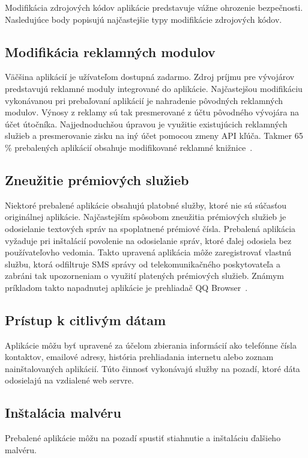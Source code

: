 Modifikácia zdrojových kódov aplikácie predstavuje vážne ohrozenie bezpečnosti. Nasledujúce body popisujú najčastejšie typy modifikácie zdrojových kódov.

\subsection*{Modifikácia reklamných modulov}
Väčšina aplikácií je užívateľom dostupná zadarmo. Zdroj príjmu pre vývojárov predstavujú reklamné moduly integrované do aplikácie. Najčastejšou modifikáciu vykonávanou pri prebaľovaní aplikácií je nahradenie pôvodných reklamných modulov. Výnosy z reklamy sú tak presmerované z účtu pôvodného vývojára na účet útočníka. Najjednoduchšou úpravou je využitie existujúcich reklamných služieb a presmerovanie zisku na iný účet pomocou zmeny API kľúča. Takmer 65 \% prebalených aplikácií obsahuje modifikované reklamné knižnice~\cite{fakeapps}.

\subsection*{Zneužitie prémiových služieb}
Niektoré prebalené aplikácie obsahujú platobné služby, ktoré nie sú súčasťou originálnej aplikácie. Najčastejším spôsobom zneužitia prémiových služieb je odosielanie textových správ na spoplatnené prémiové čísla. Prebalená aplikácia vyžaduje pri inštalácií povolenie na odosielanie správ, ktoré ďalej odosiela bez používateľovho vedomia. Takto upravená aplikácia môže zaregistrovať vlastnú službu, ktorá odfiltruje SMS správy od telekomunikačného poskytovateľa a zabráni tak upozorneniam o využití platených prémiových služieb. Známym príkladom takto napadnutej aplikácie je prehliadač QQ Browser~\cite{fakeapps}.

\subsection*{Prístup k citlivým dátam}
Aplikácie môžu byť upravené za účelom zbierania informácií ako telefónne čísla kontaktov, emailové adresy, história prehliadania internetu alebo zoznam nainštalovaných aplikácií. Túto činnosť vykonávajú služby na pozadí, ktoré dáta odosielajú na vzdialené web servre. 

\subsection*{Inštalácia malvéru}
Prebalené aplikácie môžu na pozadí spustiť stiahnutie a inštaláciu ďalšieho malvéru. 

